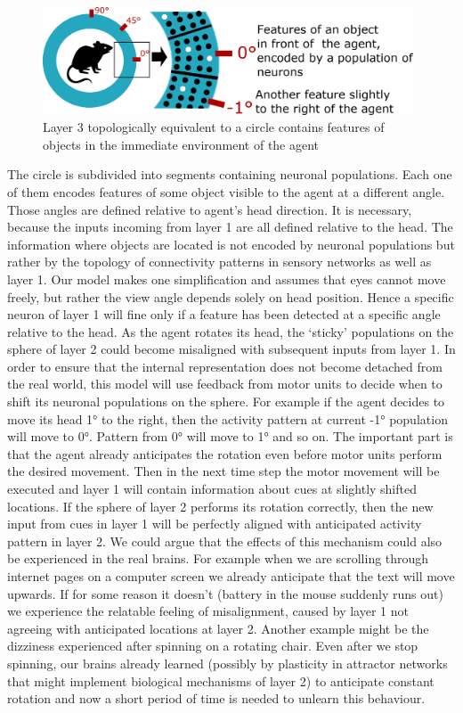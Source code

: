 \documentclass[12pt]{article}
\begin{document}
\begin{figure}[!h]
	\centering
	\includegraphics[width=11cm]{rodent_in_cirle}
	\caption{Layer 3 topologically equivalent to a circle contains features of objects in the immediate environment of the agent}
	\label{fig:rodent_in_circle}
\end{figure}

The circle is subdivided into segments containing neuronal populations. Each one of them encodes features of some object visible to the agent at a different angle. Those angles are defined relative to agent's head direction. It is necessary, because the inputs incoming from layer 1 are all  defined relative to the head. The information where objects are located is not encoded by neuronal populations but rather by the topology of connectivity patterns in sensory networks as well as layer 1. Our model makes one simplification and assumes that eyes cannot move freely, but rather the view angle depends solely on head position. Hence a specific neuron of layer 1 will fine only if a feature has been detected at a specific angle relative to the head. As the agent rotates its head, the `sticky' populations on the sphere of layer 2 could become misaligned with subsequent inputs from layer 1. In order to ensure that the internal representation does not become detached from the real world, this model will use feedback from motor units to decide when to shift its neuronal populations on the sphere. For example if the agent decides to move its head 1° to the right, then the activity pattern at current -1° population will move to  0°. Pattern from  0° will move to  1° and so on. The important part is that the agent already anticipates the rotation even before motor units perform the desired movement. Then in the next time step the motor movement will be executed and layer 1 will contain information about cues at slightly shifted locations. If the sphere of layer 2 performs its rotation correctly, then the new input from cues in layer 1 will be perfectly aligned with anticipated activity pattern in layer 2. We could argue that the effects of this mechanism could also be experienced in the real brains. For example when we are scrolling through internet pages on a computer screen we already anticipate that the text will move upwards. If for some reason it doesn't (battery in the mouse suddenly runs out) we experience the relatable feeling of misalignment, caused by layer 1 not agreeing with anticipated locations at layer 2. Another example might be the dizziness experienced after spinning on a rotating chair. Even after we stop spinning, our brains already learned (possibly by plasticity in attractor networks that might implement biological mechanisms of layer 2) to anticipate constant rotation and now a short period of time is needed to unlearn this behaviour.
\end{document}

